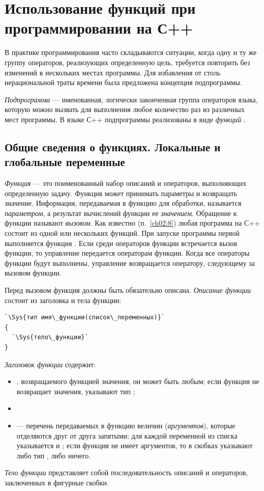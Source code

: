 \chapter[Использование функций при программировании на С++]{Использование функций при программировании на С++}\label{ch04}
В практике программирования часто складываются ситуации, когда одну и ту же группу операторов, реализующих определенную
цель, требуется повторить без изменений в нескольких местах программы. Для избавления от столь нерациональной траты
времени была предложена концепция подпрограммы.

\emph{Подпрограмма} --- именованная, логически законченная группа операторов языка,
которую можно вызвать для выполнения любое количество раз из различных мест программы. В языке С++ подпрограммы
реализованы в виде \emph{функций }\cite{KR}.

\section[Общие сведения о функциях]{Общие сведения о функциях. Локальные и
глобальные переменные}
\emph{Функция} --- это поименованный набор описаний и операторов, выполняющих определенную
задачу. Функция может принимать параметры и возвращать значение. Информация, передаваемая в функцию для обработки,
называется \emph{параметром}, а результат вычислений функции ее \emph{значением}. Обращение к
функции называют \emph{вызовом}. Как известно (п.~\ref{ch02:8}) любая программа на С++ состоит из одной или
нескольких функций. При запуске программы первой выполняется функция . Если среди операторов
функции  встречается вызов функции, то управление передается операторам функции. Когда все
операторы функции будут выполнены, управление возвращается оператору, следующему за вызовом функции.

Перед вызовом функция должны быть обязательно описана. \emph{Описание функции}
состоит из заголовка и тела функции:
\begin{lstlisting}
`\Sys{тип имя\_функции(список\_переменных)}`
{
  `\Sys{тело\_функции}`
}
\end{lstlisting}
\emph{Заголовок функции} содержит:

\begin{itemize}
\item {}, возвращаемого функцией значения, он может быть любым; если функция не возвращает значения,
указывают тип ;
\item {}
\item {} --- перечень передаваемых в функцию величин (\emph{аргументов}),
которые отделяются друг от друга запятыми; для каждой переменной из списка указывается  и
; если функция не имеет аргументов, то в скобках указывают либо тип , либо
ничего.
\end{itemize}
\emph{Тело функции} представляет собой последовательность описаний и
операторов, заключенных в фигурные скобки.

